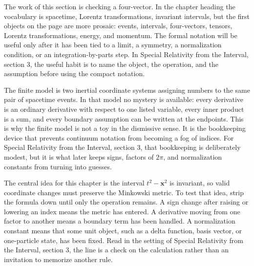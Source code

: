 











The work of this section is checking a four-vector.  In the chapter heading the vocabulary is spacetime, Lorentz transformations, invariant intervals, but the first objects on the page are more prosaic: events, intervals, four-vectors, tensors, Lorentz transformations, energy, and momentum.  The formal notation will be useful only after it has been tied to a limit, a symmetry, a normalization condition, or an integration-by-parts step.  In Special Relativity from the Interval, section 3, the useful habit is to name the object, the operation, and the assumption before using the compact notation.

The finite model is two inertial coordinate systems assigning numbers to the same pair of spacetime events.  In that model no mystery is available: every derivative is an ordinary derivative with respect to one listed variable, every inner product is a sum, and every boundary assumption can be written at the endpoints.  This is why the finite model is not a toy in the dismissive sense.  It is the bookkeeping device that prevents continuum notation from becoming a fog of indices.  For Special Relativity from the Interval, section 3, that bookkeeping is deliberately modest, but it is what later keeps signs, factors of \(2\pi\), and normalization constants from turning into guesses.

The central idea for this chapter is the interval \(t^2-\bm x^2\) is invariant, so valid coordinate changes must preserve the Minkowski metric.  To test that idea, strip the formula down until only the operation remains.  A sign change after raising or lowering an index means the metric has entered.  A derivative moving from one factor to another means a boundary term has been handled.  A normalization constant means that some unit object, such as a delta function, basis vector, or one-particle state, has been fixed.  Read in the setting of Special Relativity from the Interval, section 3, the line is a check on the calculation rather than an invitation to memorize another rule.

